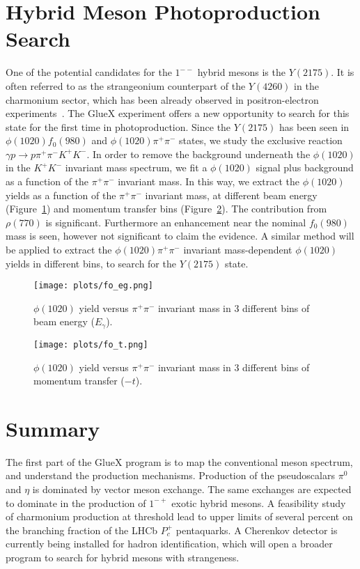\documentclass[a4paper]{jpconf}
\begin{document}
\section{Hybrid Meson Photoproduction Search}
One of the potential candidates for the $1^{--}$ hybrid mesons is the $Y(2175)$. It is often referred to as the strangeonium counterpart of the $Y(4260)$ in the charmonium sector, which has been already observed in positron-electron experiments~\cite{ref.6,ref.7}. The GlueX experiment offers a new opportunity to search for this state for the first time in photoproduction. Since the $Y(2175)$ has been seen in $\phi(1020)f_{0}(980)$ and $\phi(1020)\pi^{+}\pi^{-}$ states, we study the exclusive reaction $\gamma p \rightarrow p \pi^{+}\pi^{-}K^{+}K^{-}$. In order to remove the background underneath the $\phi(1020)$ in the $K^{+}K^{-}$ invariant mass spectrum, we fit a $\phi(1020)$ signal plus background as a function of the $\pi^{+}\pi^{-}$ invariant mass. In this way, we extract the $\phi(1020)$ yields as a function of the $\pi^{+}\pi^{-}$ invariant mass, at different beam energy (Figure~\ref{fig.7}) and momentum transfer bins (Figure~\ref{fig.8}). The contribution from $\rho(770)$ is significant. Furthermore an enhancement near the nominal $f_{0}(980)$ mass is seen, however not significant to claim the evidence. A similar method will be applied to extract the $\phi(1020)\pi^{+}\pi^{-}$ invariant mass-dependent $\phi(1020)$ yields in different bins, to search for the $Y(2175)$ state.

\begin{figure}[h]
    \centering
    \texttt{[image: plots/fo\_eg.png]}
    \caption{\label{fig.7}$\phi(1020)$ yield versus $\pi^{+}\pi^{-}$ invariant mass in 3 different bins of beam energy ($E_{\gamma}$).}
\end{figure}

\begin{figure}[h]
    \centering
    \texttt{[image: plots/fo\_t.png]}
    \caption{\label{fig.8}$\phi(1020)$ yield versus $\pi^{+}\pi^{-}$ invariant mass in 3 different bins of momentum transfer ($-t$).}
\end{figure}

\section{Summary}
The first part of the GlueX program is to map the conventional meson spectrum, and understand the production mechanisms. Production of the pseudoscalars $\pi^{0}$ and $\eta$ is dominated by vector meson exchange. The same exchanges are expected to dominate in the production of $1^{-+}$ exotic hybrid mesons. A feasibility study of charmonium production at threshold lead to upper limits of several percent on the branching fraction of the LHCb $P^{+}_{c}$ pentaquarks. A Cherenkov detector is currently being installed for hadron identification, which will open a broader program to search for hybrid mesons with strangeness.
\end{document}
